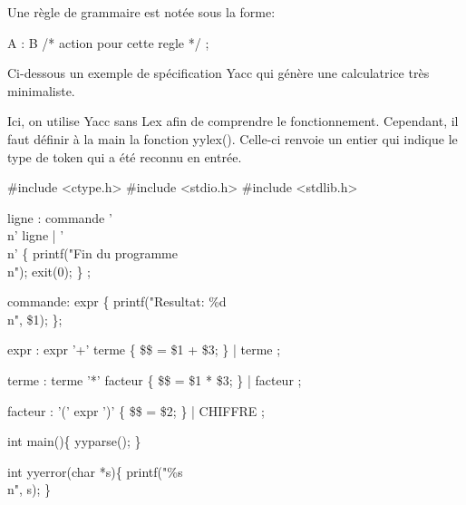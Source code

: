 \documentclass{article}
\begin{document}
Une règle de grammaire est notée sous la forme:

A : B { /* action pour cette regle */ };

Ci-dessous un exemple de spécification Yacc qui génère une calculatrice très minimaliste.

Ici, on utilise Yacc sans Lex afin de comprendre le fonctionnement. Cependant, il faut définir à la main la fonction yylex(). Celle-ci renvoie un entier qui indique le type de token qui a été reconnu en entrée.

    \#include <ctype.h>
    \#include <stdio.h>
    \#include <stdlib.h>


ligne : commande '\\n' ligne
    | '\\n' \{ printf("Fin du programme\\n"); exit(0); \}
    ;

commande: expr \{ printf("Resultat: \%d\\n", \$1); \};


expr : expr '+' terme \{ \$\$ = \$1 + \$3; \}
    | terme
    ;
   
terme : terme '*' facteur \{ \$\$ = \$1 * \$3; \}
    | facteur
    ;
   
facteur : '(' expr ')' \{ \$\$ = \$2; \}
    | CHIFFRE
    ;

int main()\{
    yyparse();   
\}

int yyerror(char *s)\{
    printf("\%s \\n", s);
\}
\end{document}
